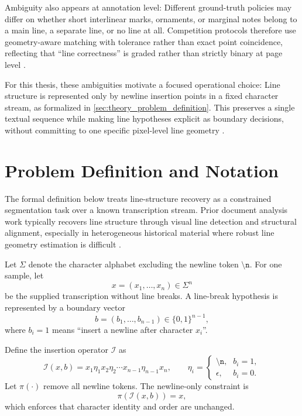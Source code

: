 Ambiguity also appears at annotation level: Different ground-truth policies may differ on whether short interlinear marks, ornaments, or marginal notes belong to a main line, a separate line, or no line at all. Competition protocols therefore use geometry-aware matching with tolerance rather than exact point coincidence, reflecting that ``line correctness'' is graded rather than strictly binary at page level .

For this thesis, these ambiguities motivate a focused operational choice: Line structure is represented only by newline insertion points in a fixed character stream, as formalized in \autoref{sec:theory_problem_definition}. This preserves a single textual sequence while making line hypotheses explicit as boundary decisions, without committing to one specific pixel-level line geometry .

\section{Problem Definition and Notation}
\label{sec:theory_problem_definition}

The formal definition below treats line-structure recovery as a constrained segmentation task over a known transcription stream. Prior document analysis work typically recovers line structure through visual line detection and structural alignment, especially in heterogeneous historical material where robust line geometry estimation is difficult .

Let $\Sigma$ denote the character alphabet excluding the newline token $\texttt{\textbackslash n}$. For one sample, let
\[
x=(x_1,\dots,x_n)\in\Sigma^n
\]
be the supplied transcription without line breaks. A line-break hypothesis is represented by a boundary vector
\[
b=(b_1,\dots,b_{n-1})\in\{0,1\}^{n-1},
\]
where $b_i=1$ means ``insert a newline after character $x_i$''.

Define the insertion operator $\mathcal{I}$ as
\begin{equation}
\mathcal{I}(x,b)=x_1\eta_1x_2\eta_2\cdots x_{n-1}\eta_{n-1}x_n,\qquad
\eta_i=
\begin{cases}
\texttt{\textbackslash n}, & b_i=1,\\
\epsilon, & b_i=0.
\end{cases}
\label{eq:newline_insertion_operator}
\end{equation}
Let $\pi(\cdot)$ remove all newline tokens. The newline-only constraint is
\begin{equation}
\pi\!\left(\mathcal{I}(x,b)\right)=x,
\label{eq:newline_projection_constraint}
\end{equation}
which enforces that character identity and order are unchanged.

